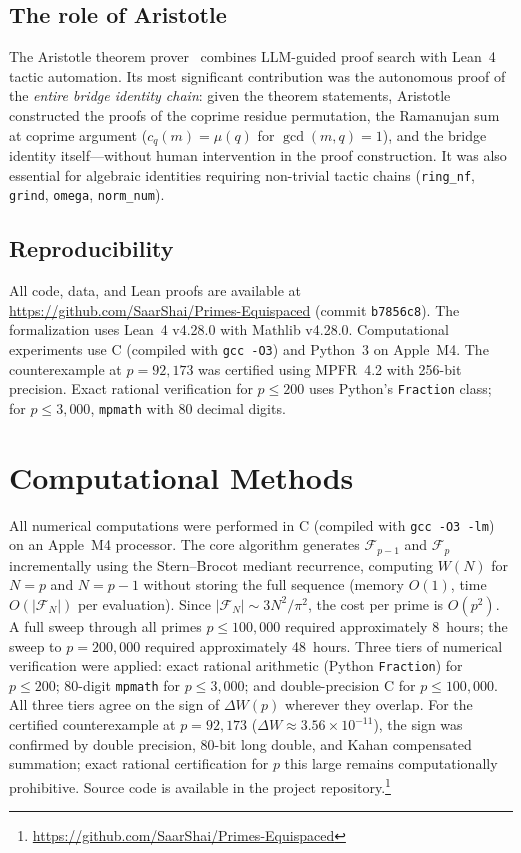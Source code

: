 \documentclass[11pt]{article}
\theoremstyle{definition}
\newcommand{\F}{\mathcal{F}}
\begin{document}
\subsection{The role of Aristotle}

The Aristotle theorem prover~\cite{Aristotle2025} combines
LLM-guided proof search with Lean~4 tactic automation.
Its most significant contribution was the autonomous proof of the
\emph{entire bridge identity chain}: given the theorem statements,
Aristotle constructed the proofs of the coprime residue permutation,
the Ramanujan sum at coprime argument ($c_q(m) = \mu(q)$ for
$\gcd(m,q) = 1$), and the bridge identity itself---without human
intervention in the proof construction.  It was also essential for
algebraic identities requiring non-trivial tactic chains
(\texttt{ring\_nf}, \texttt{grind}, \texttt{omega}, \texttt{norm\_num}).

\subsection{Reproducibility}

All code, data, and Lean proofs are available at
\url{https://github.com/SaarShai/Primes-Equispaced}
(commit \texttt{b7856c8}).
The formalization uses Lean~4 v4.28.0 with Mathlib v4.28.0.
Computational experiments use C (compiled with \texttt{gcc~-O3})
and Python~3 on Apple~M4.  The counterexample at $p = 92{,}173$
was certified using MPFR~4.2 with 256-bit precision.
Exact rational verification for $p \le 200$ uses Python's
\texttt{Fraction} class; for $p \le 3{,}000$, \texttt{mpmath}
with 80 decimal digits.


\section{Computational Methods}\label{sec:computation}

All numerical computations were performed in C (compiled with
\texttt{gcc -O3 -lm}) on an Apple~M4 processor.  The core
algorithm generates $\F_{p-1}$ and $\F_p$ incrementally using
the Stern--Brocot mediant recurrence, computing $W(N)$ for
$N = p$ and $N = p-1$ without storing the full sequence
(memory $O(1)$, time $O(|\F_N|)$ per evaluation).  Since
$|\F_N| \sim 3N^2/\pi^2$, the cost per prime is $O(p^2)$.
A full sweep through all primes $p \le 100{,}000$ required
approximately 8~hours; the sweep to $p = 200{,}000$ required
approximately 48~hours.  Three tiers of numerical verification were applied:
exact rational arithmetic (Python \texttt{Fraction}) for
$p \le 200$; 80-digit \texttt{mpmath} for $p \le 3{,}000$;
and double-precision C for $p \le 100{,}000$.  All three
tiers agree on the sign of $\Delta W(p)$ wherever they overlap.  For the certified counterexample at
$p = 92{,}173$ ($\Delta W \approx 3.56 \times 10^{-11}$), the
sign was confirmed by double precision, 80-bit long double,
and Kahan compensated summation; exact rational certification
for $p$ this large remains computationally prohibitive.
Source code is available in the project
repository.\footnote{\url{https://github.com/SaarShai/Primes-Equispaced}}
\end{document}
